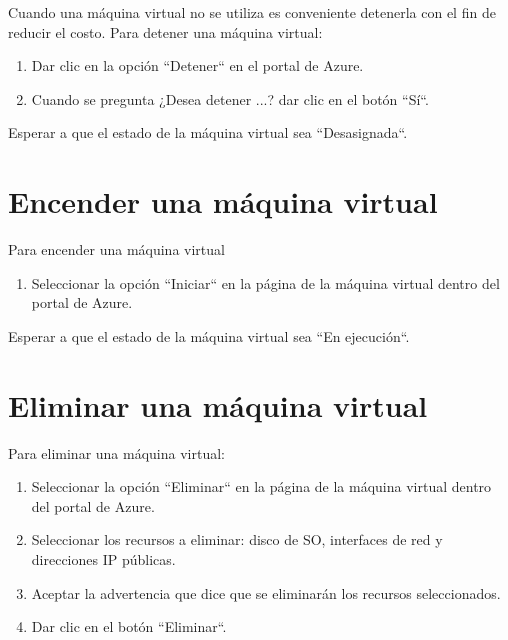 \documentclass[11pt,a4paper,oneside]{book}
\begin{document}
Cuando una máquina virtual no se utiliza es conveniente detenerla con el fin de reducir el costo. Para detener una máquina virtual:

\begin{enumerate}

\item Dar clic en la opción ``Detener`` en el portal de Azure.

\item Cuando se pregunta ¿Desea detener ...? dar clic en el botón ``Sí``.

\end{enumerate}

Esperar a que el estado de la máquina virtual sea ``Desasignada``.

\section{Encender una máquina virtual}

Para encender una máquina virtual

\begin{enumerate}

\item Seleccionar la opción ``Iniciar`` en la página de la máquina virtual dentro del portal de Azure.

\end{enumerate}

Esperar a que el estado de la máquina virtual sea ``En ejecución``.

\section{Eliminar una máquina virtual}

Para eliminar una máquina virtual:

\begin{enumerate}

\item Seleccionar la opción ``Eliminar`` en la página de la máquina virtual dentro del portal de Azure.

\item Seleccionar los recursos a eliminar: disco de SO, interfaces de red y direcciones IP públicas.

\item Aceptar la advertencia que dice que se eliminarán los recursos seleccionados.

\item Dar clic en el botón ``Eliminar``.

\end{enumerate}
\end{document}
